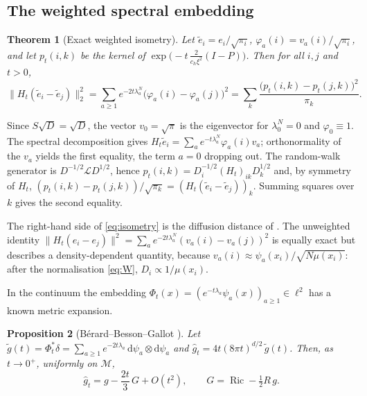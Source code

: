 \documentclass[11pt,a4paper]{article}
\makeatletter
\theoremstyle{stmt}
\newtheorem{theorem}{Theorem}[section]
\newtheorem{proposition}[theorem]{Proposition}
\theoremstyle{defn}
\theoremstyle{rmk}
\renewenvironment{proof}[1][\proofname]{\par\pushQED{\qed}\normalfont\topsep6\p@\@plus6\p@\relax
  \trivlist\item[\hskip\labelsep{\sffamily\itshape\small #1.}]\ignorespaces}{\popQED\endtrivlist\@endpefalse}
\numberwithin{equation}{section}
\DeclareMathOperator{\Ric}{Ric}
\newcommand{\M}{\mathcal{M}}
\newcommand{\Lc}{\mathcal{L}}
\newcommand{\dd}{\mathrm{d}}
\makeatother
\begin{document}
\subsection{The weighted spectral embedding}

\begin{theorem}[Exact weighted isometry]\label{thm:isometry}
Let $\tilde e_i=e_i/\sqrt{\pi_i}$, $\varphi_a(i)=v_a(i)/\sqrt{\pi_i}$, and let $p_t(i,k)$ be the kernel of $\exp\!\big(-t\,\tfrac{2}{c_h\xi^2}(I-P)\big)$. Then for all $i,j$ and $t>0$,
\begin{equation}\label{eq:isometry}
\big\|H_t(\tilde e_i-\tilde e_j)\big\|_2^2=\sum_{a\ge1}e^{-2t\lambda_a^{N}}\big(\varphi_a(i)-\varphi_a(j)\big)^2=\sum_k\frac{\big(p_t(i,k)-p_t(j,k)\big)^2}{\pi_k}.
\end{equation}
\end{theorem}

\begin{proof}
Since $S\sqrt D=\sqrt D$, the vector $v_0=\sqrt\pi$ is the eigenvector for $\lambda_0^N=0$ and $\varphi_0\equiv1$. The spectral decomposition gives $H_t\tilde e_i=\sum_ae^{-t\lambda_a^N}\varphi_a(i)v_a$; orthonormality of the $v_a$ yields the first equality, the term $a=0$ dropping out. The random-walk generator is $D^{-1/2}\Lc D^{1/2}$, hence $p_t(i,k)=D_i^{-1/2}(H_t)_{ik}D_k^{1/2}$ and, by symmetry of $H_t$, $(p_t(i,k)-p_t(j,k))/\sqrt{\pi_k}=(H_t(\tilde e_i-\tilde e_j))_k$. Summing squares over $k$ gives the second equality.
\end{proof}

The right-hand side of \eqref{eq:isometry} is the diffusion distance of \cite{CoifmanLafon}. The unweighted identity $\|H_t(e_i-e_j)\|^2=\sum_ae^{-2t\lambda_a^N}(v_a(i)-v_a(j))^2$ is equally exact but describes a density-dependent quantity, because $v_a(i)\approx\psi_a(x_i)/\sqrt{N\mu(x_i)}$: after the normalisation \eqref{eq:W}, $D_i\propto1/\mu(x_i)$.

In the continuum the embedding $\Phi_t(x)=(e^{-t\lambda_a}\psi_a(x))_{a\ge1}\in\ell^2$ has a known metric expansion.

\begin{proposition}[B\'erard--Besson--Gallot \cite{BBG}]\label{prop:BBG}
Let $\tilde g(t)=\Phi_t^*\delta=\sum_{a\ge1}e^{-2t\lambda_a}\,\dd\psi_a\otimes\dd\psi_a$ and $\hat g_t=4t(8\pi t)^{d/2}\,\tilde g(t)$. Then, as $t\to0^+$, uniformly on $\M$,
\begin{equation}\label{eq:BBG}
\hat g_t=g-\frac{2t}{3}\,G+O(t^2),\qquad G=\Ric-\tfrac12R\,g .
\end{equation}
\end{proposition}
\end{document}
